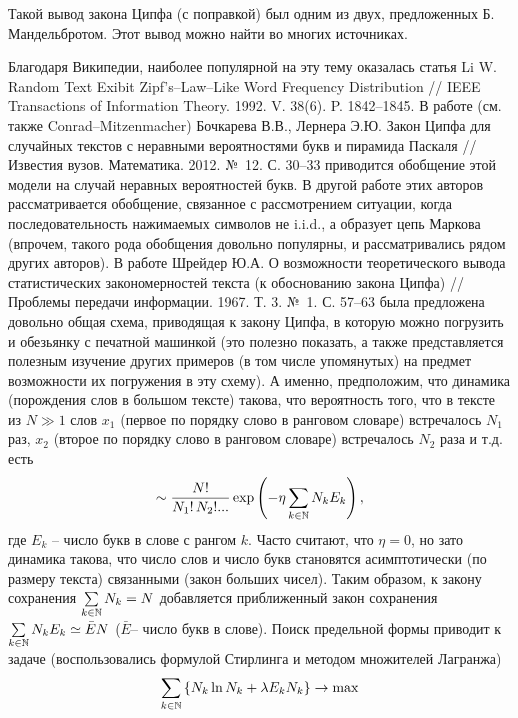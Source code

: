 \begin{remark}
Такой вывод закона Ципфа (с поправкой) был одним из 
двух, предложенных Б. Мандельбротом. Этот 
вывод можно найти во многих источниках. 

Благодаря Википедии, наиболее 
популярной на эту тему оказалась статья  Li W. Random Text Exibit 
Zipf's--Law--Like Word Frequency Distribution // IEEE Transactions of 
Information Theory. 1992. V. 38(6). P. 1842--1845. В работе (см. также 
Conrad--Mitzenmacher) Бочкарева В.В., Лернера Э.Ю. Закон Ципфа для случайных текстов с неравными 
вероятностями букв и пирамида Паскаля // Известия вузов. Математика. 2012. №~12. С. 30--33 приводится обобщение этой модели на случай неравных 
вероятностей букв. В другой работе этих авторов рассматривается обобщение, 
связанное с рассмотрением ситуации, когда последовательность нажимаемых 
символов не i.i.d., а образует цепь Маркова (впрочем, такого рода обобщения 
довольно популярны, и рассматривались рядом других авторов). В работе 
Шрейдер Ю.А. О возможности теоретического вывода статистических закономерностей текста 
(к обоснованию закона Ципфа) // Проблемы передачи информации. 1967. Т. 3. №~1. С. 57--63 была предложена довольно общая схема, приводящая к закону 
Ципфа, в которую можно погрузить и обезьянку с печатной 
машинкой (это полезно показать, а также 
представляется полезным изучение других примеров (в том числе упомянутых) на 
предмет возможности их погружения в эту схему). 
А именно, предположим, что динамика (порождения слов в большом 
тексте) такова, что вероятность того, что в тексте из $N\gg 1$ слов $x_1 $ 
(первое по порядку слово в ранговом словаре) встречалось $N_1 $ раз, $x_2 $ 
(второе по порядку слово в ранговом словаре) встречалось $N_2 $ раза и т.д. 
есть
\[
\sim \frac{N!}{N_1 !\,N_2 !...}\exp \left( {-\eta \sum\limits_{k\in \mathbb{N}} 
{N_k E_k } } \right),
\]
где $E_k $ -- число букв в слове с рангом $k$. Часто считают, что $\eta =0$, 
но зато динамика такова, что число слов и число букв становятся 
асимптотически (по размеру текста) связанными (закон больших чисел). Таким 
образом, к закону сохранения $\sum\limits_{k\in  \mathbb{N}} {N_k =N} $ 
добавляется приближенный закон сохранения $\sum\limits_{k\in  \mathbb{N}} {N_k 
E_k } \simeq \bar {E}N$ ($\bar {E}$-- число букв в слове). Поиск предельной 
формы приводит к задаче (воспользовались формулой Стирлинга и методом 
множителей Лагранжа)%
\[
\sum\limits_{k\in  \mathbb{N}} {\left\{ {N_k \ln N_k +\lambda E_k N_k } 
\right\}} \to \mathop {\max }\limits_{ {\scriptsize \begin{array}{c}

\end{array}}}\]
\end{remark}

